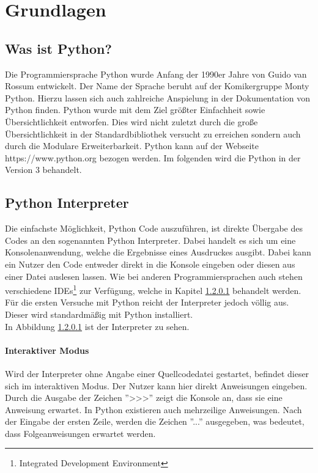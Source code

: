 
\section{Grundlagen}
\subsection{Was ist Python?} %
Die Programmiersprache Python wurde Anfang der 1990er Jahre von Guido van Rossum entwickelt.
Der Name der Sprache beruht auf der Komikergruppe  Monty Python.
Hierzu lassen sich auch zahlreiche Anspielung in der Dokumentation von Python finden.
Python wurde mit dem Ziel größter Einfachheit sowie Übersichtlichkeit entworfen.
Dies wird nicht zuletzt durch die große Übersichtlichkeit in der Standardbibliothek versucht zu erreichen sondern auch durch die Modulare Erweiterbarkeit.
Python kann auf der Webseite https://www.python.org bezogen werden.
Im folgenden wird die Python in der Version 3 behandelt.

\subsection{Python Interpreter} %
Die einfachste Möglichkeit, Python Code auszuführen, ist direkte Übergabe des Codes an den sogenannten Python Interpreter. Dabei handelt es sich um eine Konsolenanwendung, welche die Ergebnisse eines Ausdruckes ausgibt. Dabei kann ein Nutzer den Code entweder direkt in die Konsole eingeben oder diesen aus einer Datei auslesen lassen. Wie bei anderen Programmiersprachen auch stehen verschiedene IDEs\footnote{Integrated Development Environment} zur Verfügung, welche in Kapitel \ref{} behandelt werden. Für die ersten Versuche mit Python reicht der Interpreter jedoch völlig aus. Dieser wird standardmäßig mit Python installiert.\\
In Abbildung \ref{} ist der Interpreter zu sehen. 
\paragraph{Interaktiver Modus} Wird der Interpreter ohne Angabe einer Quellcodedatei gestartet, befindet dieser sich im interaktiven Modus. Der Nutzer kann hier direkt Anweisungen eingeben. Durch die Ausgabe der Zeichen ''>>>'' zeigt die Konsole an, dass sie eine Anweisung erwartet. In Python existieren auch mehrzeilige Anweisungen. Nach der Eingabe der ersten Zeile, werden die Zeichen ''...'' ausgegeben, was bedeutet, dass Folgeanweisungen erwartet werden. 
